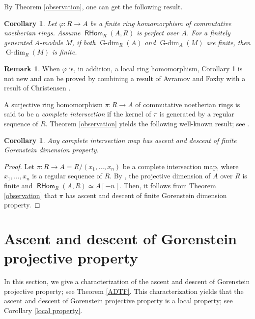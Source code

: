 \documentclass{amsart}
\newcommand{\0}{{\bf{0}}}
\DeclareMathOperator{\Gdim}{G-dim}
\DeclareMathOperator{\RHom}{\mathsf{RHom}}
\newtheorem{corollary}[theorem]{Corollary}
\theoremstyle{definition}
\newtheorem{remark}[theorem]{Remark}
\begin{document}
By Theorem \ref{observation}, one can get the following result.

\begin{corollary}\label{application}
Let $\varphi\colon R\rightarrow A$ be a finite ring homomorphism of commutative noetherian rings. Assume $\RHom_R(A,R)$ is perfect over $A$. For a finitely generated $A$-module $M$, if  both $\Gdim_R(A)$ and $\Gdim_A(M)$ are finite, then $\Gdim_R(M)$ is finite.
\end{corollary}
\begin{remark}\label{descentapplication}
    When $\varphi$ is, in addition, a local ring homomorphism, Corollary \ref{application} is not new and can be proved by combining a result of Avramov and Foxby \cite[Lemma 6.5 and Theorem 7.11]{AF} with a result of Christensen \cite[Proposition 8.3]{Chr01}.
\end{remark}

A surjective ring homomorphism $\pi\colon R\rightarrow A$ of commutative noetherian rings is said to be a \emph{complete intersection} if the kernel of $\pi$ is generated by a regular sequence of $R$. Theorem \ref{observation} yields the following well-known result; see \cite[Theorem 2.3.12]{Chr00}.

\begin{corollary}\label{CImap}
Any complete intersection map has ascent and descent of finite Gorenstein dimension property.
\end{corollary}

\begin{proof}
Let $\pi\colon R\rightarrow A=R/(x_1,\ldots,x_n)$ be a complete intersection map, where $x_1,\ldots,x_n$ is a regular sequence of $R$. By \cite[Proposition 1.6.10 and Corollary 1.6.14]{BH}, the projective dimension of $A$ over $R$ is finite and $\RHom_R(A,R)\simeq A[-n]$. Then, it follows from Theorem \ref{observation} that $\pi$ has ascent and descent of finite Gorenstein dimension property.
\end{proof}


\section{Ascent and descent of Gorenstein projective property}\label{sectionadgp}

In this section, we give a characterization of the ascent and descent of Gorenstein projective property; see Theorem \ref{ADTF}. This characterization yields that the ascent and descent of Gorenstein projective property is a local property;
see Corollary \ref{local property}.
\end{document}
